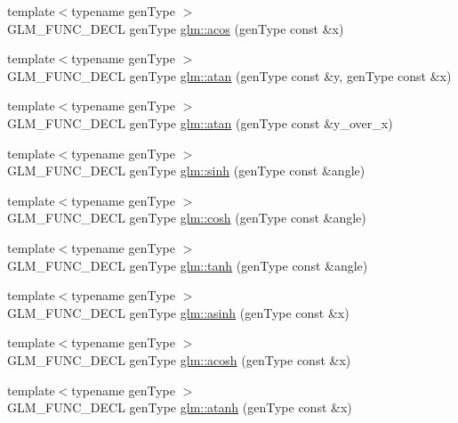 \begin{DoxyCompactItemize}
{\footnotesize template$<$typename gen\+Type $>$ }\\G\+L\+M\+\_\+\+F\+U\+N\+C\+\_\+\+D\+E\+C\+L gen\+Type \hyperlink{group__core__func__trigonometric_gac85497ed2e39d4cac4ac32bed4dfc506}{glm\+::acos} (gen\+Type const \&x)
\item 
{\footnotesize template$<$typename gen\+Type $>$ }\\G\+L\+M\+\_\+\+F\+U\+N\+C\+\_\+\+D\+E\+C\+L gen\+Type \hyperlink{group__core__func__trigonometric_gabf80ac0817d1db032dd6a0969aa2b84a}{glm\+::atan} (gen\+Type const \&y, gen\+Type const \&x)
\item 
{\footnotesize template$<$typename gen\+Type $>$ }\\G\+L\+M\+\_\+\+F\+U\+N\+C\+\_\+\+D\+E\+C\+L gen\+Type \hyperlink{group__core__func__trigonometric_gaa7be96f0c12a40eeac5c7f04a3d465a1}{glm\+::atan} (gen\+Type const \&y\+\_\+over\+\_\+x)
\item 
{\footnotesize template$<$typename gen\+Type $>$ }\\G\+L\+M\+\_\+\+F\+U\+N\+C\+\_\+\+D\+E\+C\+L gen\+Type \hyperlink{group__core__func__trigonometric_ga2e8c9a896e803661058de83429aa6eda}{glm\+::sinh} (gen\+Type const \&angle)
\item 
{\footnotesize template$<$typename gen\+Type $>$ }\\G\+L\+M\+\_\+\+F\+U\+N\+C\+\_\+\+D\+E\+C\+L gen\+Type \hyperlink{group__core__func__trigonometric_gaa7685634f6e920ba9a683e5ec7aed976}{glm\+::cosh} (gen\+Type const \&angle)
\item 
{\footnotesize template$<$typename gen\+Type $>$ }\\G\+L\+M\+\_\+\+F\+U\+N\+C\+\_\+\+D\+E\+C\+L gen\+Type \hyperlink{group__core__func__trigonometric_ga941f20e5315113d1a2e037f073a62f04}{glm\+::tanh} (gen\+Type const \&angle)
\item 
{\footnotesize template$<$typename gen\+Type $>$ }\\G\+L\+M\+\_\+\+F\+U\+N\+C\+\_\+\+D\+E\+C\+L gen\+Type \hyperlink{group__core__func__trigonometric_gaa52acc1218a5ddd0f8d94fcd098685b1}{glm\+::asinh} (gen\+Type const \&x)
\item 
{\footnotesize template$<$typename gen\+Type $>$ }\\G\+L\+M\+\_\+\+F\+U\+N\+C\+\_\+\+D\+E\+C\+L gen\+Type \hyperlink{group__core__func__trigonometric_ga961d72b4a20d09d6e71fdf076ad4f433}{glm\+::acosh} (gen\+Type const \&x)
\item 
{\footnotesize template$<$typename gen\+Type $>$ }\\G\+L\+M\+\_\+\+F\+U\+N\+C\+\_\+\+D\+E\+C\+L gen\+Type \hyperlink{group__core__func__trigonometric_gaa20b78cb9c12e30bd5a3054b8cb3d099}{glm\+::atanh} (gen\+Type const \&x)
\end{DoxyCompactItemize}


